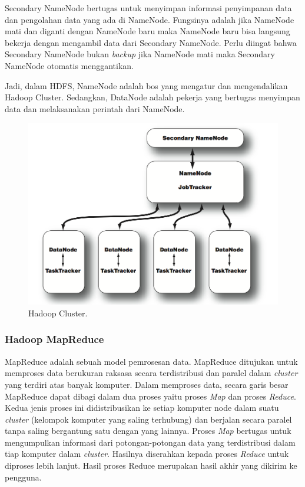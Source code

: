 Secondary NameNode bertugas untuk menyimpan informasi penyimpanan data dan pengolahan data yang ada di NameNode. Fungsinya adalah jika NameNode mati dan diganti dengan NameNode baru maka NameNode baru bisa langsung bekerja dengan mengambil data dari Secondary NameNode. Perlu diingat bahwa Secondary NameNode bukan \textit{backup} jika NameNode mati maka Secondary NameNode otomatis menggantikan.

Jadi, dalam HDFS, NameNode adalah bos yang mengatur dan mengendalikan Hadoop Cluster. Sedangkan, DataNode adalah pekerja yang bertugas menyimpan data dan melaksanakan perintah dari NameNode.

\begin{figure}
	\centering
	\includegraphics[scale=0.3]{Gambar/hadoop-cluster.png}
	\caption[Hadoop Cluster]{Hadoop Cluster.\cite{Lam:2010:HA:1965594}}
	\label{fig:hadoop-cluster}
\end{figure}
	
\subsubsection{Hadoop MapReduce}
\label{sec:hadoop_mapreduce}
MapReduce adalah sebuah model pemrosesan data\cite{Lam:2010:HA:1965594}. MapReduce ditujukan untuk memproses data berukuran raksasa secara terdistribusi dan paralel dalam \textit{cluster} yang terdiri atas banyak komputer. Dalam memproses data, secara garis besar MapReduce dapat dibagi dalam dua proses yaitu proses \textit{Map} dan proses \textit{Reduce}. Kedua jenis proses ini didistribusikan ke setiap komputer node dalam suatu \textit{cluster} (kelompok komputer yang saling terhubung) dan berjalan secara paralel tanpa saling bergantung satu dengan yang lainnya. Proses \textit{Map} bertugas untuk mengumpulkan informasi dari potongan-potongan data yang terdistribusi dalam tiap komputer dalam \textit{cluster}. Hasilnya diserahkan kepada proses \textit{Reduce} untuk diproses lebih lanjut. Hasil proses Reduce merupakan hasil akhir yang dikirim ke pengguna. \cite{Dean:2008:MSD:1327452.1327492}

